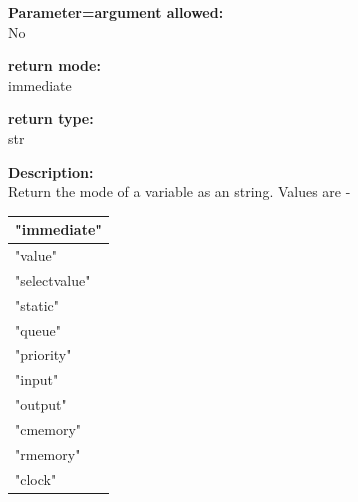         {\bf Parameter=argument allowed:} \\
        No
        
        {\bf return mode:} \\
        immediate

        {\bf return type:} \\
        str
        
        {\bf Description:} \\
        Return the mode of a variable as an string. Values are -\\
        \begin{tabular}{| l |}
        \hline
        "immediate"     \\ \hline
        "value"         \\ \hline
        "selectvalue"   \\ \hline
        "static"        \\ \hline
        "queue"          \\ \hline
        "priority"      \\ \hline
        "input"         \\ \hline
        "output"        \\ \hline
        "cmemory"       \\ \hline
        "rmemory"       \\ \hline
        "clock"         \\ \hline
        \end{tabular}

